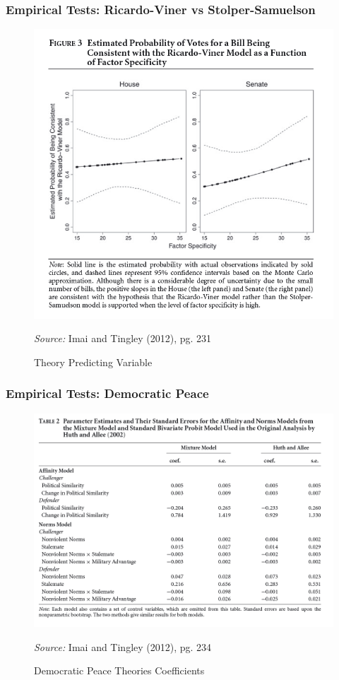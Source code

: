 \documentclass{beamer}
\begin{document}
\begin{frame}
\frametitle{Empirical Tests: Ricardo-Viner vs Stolper-Samuelson}
\begin{figure}
	\centering
	\includegraphics[width=0.7\linewidth]{rv_vs_ss}
	\caption{Theory Predicting Variable}
	
	\textit{Source:} Imai and Tingley (2012), pg. 231
	\label{fig:rv_vs_ss}
\end{figure}
\end{frame}     

\begin{frame}
\frametitle{Empirical Tests: Democratic Peace}
\begin{figure}
	\centering
	\includegraphics[width=0.7\linewidth]{table2}
	\caption{Democratic Peace Theories Coefficients}
	
	\textit{Source:} Imai and Tingley (2012), pg. 234
	\label{fig:table2}
\end{figure}
\end{frame}
\end{document}
